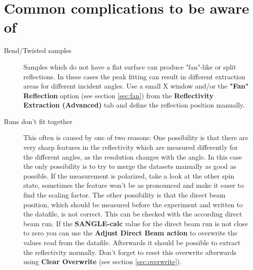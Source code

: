 \section{Common complications to be aware of}
  \begin{description}
   \item[Bend/Twisted samples] Samples which do not have a flat surface can produce "fan"-like or split reflections. In these cases the peak fitting can result in different extraction areas for different incident angles. Use a small X window and/or the \textbf{"Fan" Reflection} option (see section \ref{sec:fan}) from the \textbf{Reflectivity Extraction (Advanced)} tab and define the reflection position manually.
   
   \item[Runs don't fit together] This often is caused by one of two reasons: 
   One possibility is that there are very sharp features in the reflectivity which are measured differently for the different angles, as the resolution changes with the angle.
   In this case the only possibility is to try to merge the datasets manually as good as possible.
   If the measurement is polarized, take a look at the other spin state, sometimes the feature won't be as pronounced and make it easer to find the scaling factor. 
   The other possibility is that the direct beam position, which should be measured before the experiment and written to the datafile, is not correct. 
   This can be checked with the according direct beam run. If the \textbf{SANGLE-calc} value for the direct beam run is not close to zero you can use the \textbf{Adjust Direct Beam action}  to overwrite the values read from the datafile. 
   Afterwards it should be possible to extract the reflectivity normally. 
   Don't forget to reset this overwrite afterwards using \textbf{Clear Overwrite} (see section \ref{sec:overwrite}).
  \end{description}

